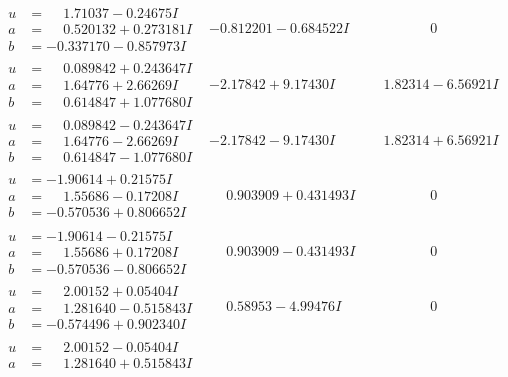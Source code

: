 \documentclass[1p]{elsarticle_modified}
\theoremstyle{definition}
\begin{document}
$$\begin{array}{c|c|c}
 \hline 
\begin{aligned}
u &= \phantom{-}1.71037 - 0.24675 I \\
a &= \phantom{-}0.520132 + 0.273181 I \\
b &= -0.337170 - 0.857973 I\end{aligned}
 & -0.812201 - 0.684522 I & \phantom{-0.000000 } 0 \\ \hline\begin{aligned}
u &= \phantom{-}0.089842 + 0.243647 I \\
a &= \phantom{-}1.64776 + 2.66269 I \\
b &= \phantom{-}0.614847 + 1.077680 I\end{aligned}
 & -2.17842 + 9.17430 I & \phantom{-}1.82314 - 6.56921 I \\ \hline\begin{aligned}
u &= \phantom{-}0.089842 - 0.243647 I \\
a &= \phantom{-}1.64776 - 2.66269 I \\
b &= \phantom{-}0.614847 - 1.077680 I\end{aligned}
 & -2.17842 - 9.17430 I & \phantom{-}1.82314 + 6.56921 I \\ \hline\begin{aligned}
u &= -1.90614 + 0.21575 I \\
a &= \phantom{-}1.55686 - 0.17208 I \\
b &= -0.570536 + 0.806652 I\end{aligned}
 & \phantom{-}0.903909 + 0.431493 I & \phantom{-0.000000 } 0 \\ \hline\begin{aligned}
u &= -1.90614 - 0.21575 I \\
a &= \phantom{-}1.55686 + 0.17208 I \\
b &= -0.570536 - 0.806652 I\end{aligned}
 & \phantom{-}0.903909 - 0.431493 I & \phantom{-0.000000 } 0 \\ \hline\begin{aligned}
u &= \phantom{-}2.00152 + 0.05404 I \\
a &= \phantom{-}1.281640 - 0.515843 I \\
b &= -0.574496 + 0.902340 I\end{aligned}
 & \phantom{-}0.58953 - 4.99476 I & \phantom{-0.000000 } 0 \\ \hline\begin{aligned}
u &= \phantom{-}2.00152 - 0.05404 I \\
a &= \phantom{-}1.281640 + 0.515843 I \\

\end{aligned}
\end{array}$$
\end{document}
